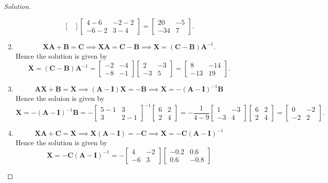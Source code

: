 \begin{enumerate}
\begin{proof}[Solution]
\begin{enumerate}
\[\begin{bmatrix}
\end{bmatrix}\begin{bmatrix}
4-6&-2-2\\-6-2&3-4
\end{bmatrix} = \begin{bmatrix}
20&-5\\-34&7
\end{bmatrix}.
\]
\item
\[
\bm{XA}+\bm B = \bm C\implies \bm{XA} = \bm C-\bm B\implies \bm{X} = (\bm C-\bm B)\bm A^{-1}.
\]
Hence the solution is given by
\[
\bm{X} = (\bm C-\bm B)\bm A^{-1} = \begin{bmatrix}
-2&-4\\-8&-1
\end{bmatrix}\begin{bmatrix}
2&-3\\-3&5
\end{bmatrix} = \begin{bmatrix}
8&-14\\-13&19
\end{bmatrix}.
\]
\item
\[
\bm{AX} +\bm B = \bm X\implies (\bm A-\bm I)\bm X = -\bm B
\implies \bm X = -(\bm A-\bm I)^{-1}\bm B
\]
Hence the soluion is given by
\[
\bm{X} = -(\bm A-\bm I)^{-1}\bm B = -\begin{bmatrix}
5-1&3\\3&2-1
\end{bmatrix}^{-1}\begin{bmatrix}
6&2\\2&4
\end{bmatrix} = -\frac{1}{4-9}\begin{bmatrix}
1&-3\\-3&4
\end{bmatrix}\begin{bmatrix}
6&2\\2&4
\end{bmatrix} = \begin{bmatrix}
0&-2\\-2&2
\end{bmatrix}.
\]
\item
\[
\bm{XA}+\bm C = \bm X\implies \bm X(\bm A-\bm I) = -\bm C\implies \bm X = -\bm C(\bm A-\bm I)^{-1}
\]
Hence the solution is given by
\[
\bm X = -\bm C(\bm A-\bm I)^{-1} = -\begin{bmatrix}
4&-2\\-6&3
\end{bmatrix}\begin{bmatrix}
-0.2&0.6\\0.6&-0.8

\end{bmatrix}\]
\end{enumerate}
\end{proof}
\end{enumerate}

